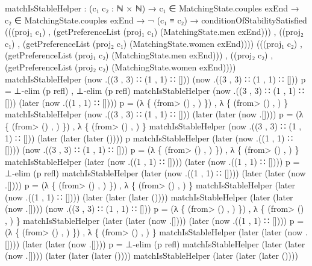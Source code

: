 \documentclass{article}
\begin{document}
\begin{code}
{matchIsStableHelper : (c₁ c₂ : ℕ × ℕ)  →
      c₁ ∈ MatchingState.couples exEnd →
      c₂ ∈ MatchingState.couples exEnd →
      ¬ (c₁ ≡ c₂) →
       conditionOfStabilitySatisfied
      (((proj₁ c₁) , (getPreferenceList (proj₁ c₁) (MatchingState.men exEnd))) , ((proj₂ c₁) , (getPreferenceList (proj₂ c₁) (MatchingState.women exEnd))))
      (((proj₁ c₂) , (getPreferenceList (proj₁ c₂) (MatchingState.men exEnd))) , ((proj₂ c₂) , (getPreferenceList (proj₂ c₂) (MatchingState.women exEnd))))
matchIsStableHelper \AgdaUnderscore{} \AgdaUnderscore{} (now .((3 , 3) ∷ (1 , 1) ∷ [])) (now .((3 , 3) ∷ (1 , 1) ∷ [])) p = ⊥-elim (p refl) , ⊥-elim (p refl)
matchIsStableHelper \AgdaUnderscore{} \AgdaUnderscore{} (now .((3 , 3) ∷ (1 , 1) ∷ [])) (later (now .((1 , 1) ∷ []))) p = (λ \{ (\AgdaUnderscore{}from>\AgdaUnderscore{} () , \AgdaUnderscore{}) \}) , λ \{ (\AgdaUnderscore{}from>\AgdaUnderscore{} () , \AgdaUnderscore{}) \}
matchIsStableHelper \AgdaUnderscore{} \AgdaUnderscore{} (now .((3 , 3) ∷ (1 , 1) ∷ [])) (later (later (now .[]))) p = (λ \{ (\AgdaUnderscore{}from>\AgdaUnderscore{} () , \AgdaUnderscore{}) \}) , λ \{ (\AgdaUnderscore{}from>\AgdaUnderscore{} () , \AgdaUnderscore{}) \}
matchIsStableHelper \AgdaUnderscore{} \AgdaUnderscore{} (now .((3 , 3) ∷ (1 , 1) ∷ [])) (later (later (later ()))) p
matchIsStableHelper \AgdaUnderscore{} \AgdaUnderscore{} (later (now .((1 , 1) ∷ []))) (now .((3 , 3) ∷ (1 , 1) ∷ [])) p = (λ \{ (\AgdaUnderscore{}from>\AgdaUnderscore{} () , \AgdaUnderscore{}) \}) , λ \{ (\AgdaUnderscore{}from>\AgdaUnderscore{} () , \AgdaUnderscore{}) \}
matchIsStableHelper \AgdaUnderscore{} \AgdaUnderscore{} (later (now .((1 , 1) ∷ []))) (later (now .((1 , 1) ∷ []))) p = ⊥-elim (p refl)
matchIsStableHelper \AgdaUnderscore{} \AgdaUnderscore{} (later (now .((1 , 1) ∷ []))) (later (later (now .[]))) p = (λ \{ (\AgdaUnderscore{}from>\AgdaUnderscore{} () , \AgdaUnderscore{}) \}) , λ \{ (\AgdaUnderscore{}from>\AgdaUnderscore{} () , \AgdaUnderscore{}) \}
matchIsStableHelper \AgdaUnderscore{} \AgdaUnderscore{} (later (now .((1 , 1) ∷ []))) (later (later (later ())))
matchIsStableHelper \AgdaUnderscore{} \AgdaUnderscore{} (later (later (now .[]))) (now .((3 , 3) ∷ (1 , 1) ∷ [])) p = (λ \{ (\AgdaUnderscore{}from>\AgdaUnderscore{} () , \AgdaUnderscore{}) \}) , λ \{ (\AgdaUnderscore{}from>\AgdaUnderscore{} () , \AgdaUnderscore{}) \}
matchIsStableHelper \AgdaUnderscore{} \AgdaUnderscore{} (later (later (now .[]))) (later (now .((1 , 1) ∷ []))) p = (λ \{ (\AgdaUnderscore{}from>\AgdaUnderscore{} () , \AgdaUnderscore{}) \}) , λ \{ (\AgdaUnderscore{}from>\AgdaUnderscore{} () , \AgdaUnderscore{}) \}
matchIsStableHelper \AgdaUnderscore{} \AgdaUnderscore{} (later (later (now .[]))) (later (later (now .[]))) p = ⊥-elim (p refl)
matchIsStableHelper \AgdaUnderscore{} \AgdaUnderscore{} (later (later (now .[]))) (later (later (later ())))
matchIsStableHelper \AgdaUnderscore{} \AgdaUnderscore{} (later (later (later ())))  \AgdaUnderscore{} \AgdaUnderscore{}

}
\end{code}
\end{document}
